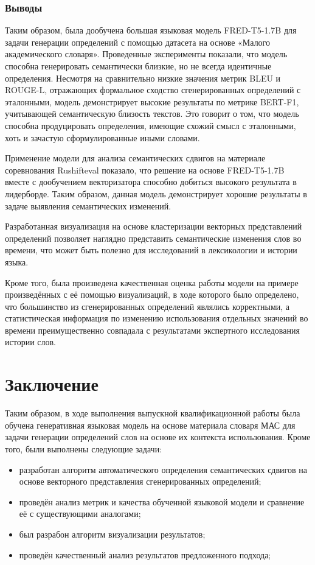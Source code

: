 \documentclass[LI,VKR]{HSEUniversity}
\begin{document}
\subsection*{Выводы}

Таким образом, была дообучена большая языковая модель FRED-T5-1.7B для задачи
генерации определений с помощью датасета на основе «Малого академического словаря».
Проведенные эксперименты показали,
что модель способна генерировать семантически близкие,
но не всегда идентичные определения.
Несмотря на сравнительно низкие значения метрик BLEU и ROUGE-L,
отражающих формальное сходство сгенерированных определений с эталонными,
модель демонстрирует высокие результаты по метрике BERT-F1,
учитывающей семантическую близость текстов.
Это говорит о том, что модель способна продуцировать определения,
имеющие схожий смысл с эталонными, хоть и зачастую сформулированные иными словами.

Применение модели для анализа семантических сдвигов на материале соревнования Rushifteval показало,
что решение на основе FRED-T5-1.7B вместе с дообучением векторизатора способно добиться высокого
результата в лидерборде.
Таким образом, данная модель демонстрирует хорошие результаты в задаче выявления семантических изменений.

Разработанная визуализация на основе кластеризации векторных представлений определений позволяет
наглядно представить семантические изменения слов во времени,
что может быть полезно для исследований в лексикологии и истории языка.

Кроме того, была произведена качественная оценка работы модели на примере произведённых
с её помощью визуализаций, в ходе которого было определено, что большинство
из сгенерированных определений являлись корректными, а статистическая информация
по изменению использования отдельных значений во времени преимущественно совпадала
с результатами экспертного исследования истории слов.

\chapter*{Заключение}

Таким образом, в ходе выполнения выпускной квалификационной работы была обучена генеративная языковая модель
на основе материала словаря МАС для задачи генерации определений слов на основе их
контекста использования.
Кроме того, были выполнены следующие задачи:
\begin{itemize}
    \item разработан алгоритм автоматического определения семантических сдвигов на
основе векторного представления сгенерированных определений;
    \item проведён анализ метрик и качества обученной языковой модели и
сравнение её с существующими аналогами;
    \item был разрабон алгоритм визуализации результатов;
    \item проведён качественный анализ результатов предложенного подхода;
\end{itemize}
\end{document}
